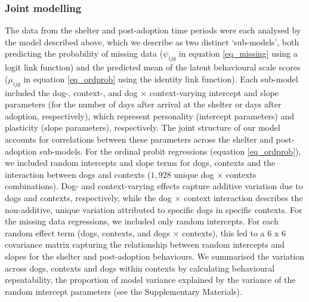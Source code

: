 \documentclass[fleqn,10pt]{wlscirep}
\begin{document}
\subsubsection*{Joint modelling}
The data from the shelter and post-adoption time periods were each analysed by the model described above, which we describe as two distinct `sub-models', both predicting the probability of missing data ($\psi_{ijg}$ in equation \ref{eq_missing} using a logit link function) and the predicted mean of the latent behavioural scale scores ($\mu_{ijg}$ in equation \ref{eq_ordprob} using the identity link function). Each sub-model included the dog-, context-, and dog $\times$ context-varying intercept and slope parameters (for the number of days after arrival at the shelter or days after adoption, respectively), which represent personality (intercept parameters) and plasticity (slope parameters), respectively.  The joint structure of our model accounts for correlations between these parameters across the shelter and post-adoption sub-models. For the ordinal probit regressions (equation \ref{eq_ordprob}), we included random intercepts and slope terms for dogs, contexts and the interaction between dogs and contexts ($1,928$ unique dog $\times$ contexts combinations). Dog- and context-varying effects capture additive variation due to dogs and contexts, respectively, while the dog $\times$ context interaction describes the non-additive, unique variation attributed to specific dogs in specific contexts. For the missing data regressions, we included only random intercepts. For each random effect term (dogs, contexts, and dogs $\times$ contexts), this led to a 6 x 6 covariance matrix capturing the relationship between random intercepts and slopes for the shelter and post-adoption behaviours. We summarised the variation across dogs, contexts and dogs within contexts by calculating behavioural repeatability, the proportion of model variance explained by the variance of the random intercept parameters (see the Supplementary Materials).
\end{document}
